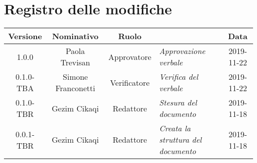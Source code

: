\section*{Registro delle modifiche}
\renewcommand{\arraystretch}{1.8}

  \begin{longtable}{|c|c|c|p{3.8cm}|c|}
    \hline

    \rowcolor{header}
    \textbf{Versione} & \textbf{Nominativo} & \textbf{Ruolo} & \centering{\textbf{Descrizione}} & \textbf{Data}\\

    \hline

    1.0.0 & Paola Trevisan & Approvatore & \small{\textit{Approvazione verbale}} & 2019-11-22\\
    0.1.0-TBA & Simone Franconetti & Verificatore & \small{\textit{Verifica del verbale }} & 2019-11-22\\
    0.1.0-TBR & Gezim Cikaqi & Redattore & \small{\textit{Stesura del documento}} & 2019-11-18\\
    0.0.1-TBR & Gezim Cikaqi & Redattore & \small{\textit{Creata la struttura del documento}} & 2019-11-18\\

    \hline
  \end{longtable}

